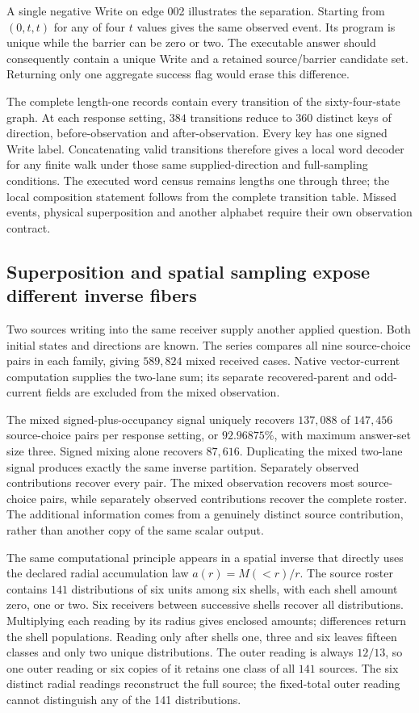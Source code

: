 A single negative Write on edge 002 illustrates the separation. Starting from $(0,t,t)$ for any of four $t$ values gives the same observed event. Its program is unique while the barrier can be zero or two. The executable answer should consequently contain a unique Write and a retained source/barrier candidate set. Returning only one aggregate success flag would erase this difference.

The complete length-one records contain every transition of the sixty-four-state graph. At each response setting, $384$ transitions reduce to $360$ distinct keys of direction, before-observation and after-observation. Every key has one signed Write label. Concatenating valid transitions therefore gives a local word decoder for any finite walk under those same supplied-direction and full-sampling conditions. The executed word census remains lengths one through three; the local composition statement follows from the complete transition table. Missed events, physical superposition and another alphabet require their own observation contract.

\subsection{Superposition and spatial sampling expose different inverse fibers}

Two sources writing into the same receiver supply another applied question. Both initial states and directions are known. The series compares all nine source-choice pairs in each family, giving $589{,}824$ mixed received cases. Native vector-current computation supplies the two-lane sum; its separate recovered-parent and odd-current fields are excluded from the mixed observation. 

The mixed signed-plus-occupancy signal uniquely recovers $137{,}088$ of $147{,}456$ source-choice pairs per response setting, or $92.96875\%$, with maximum answer-set size three. Signed mixing alone recovers $87{,}616$. Duplicating the mixed two-lane signal produces exactly the same inverse partition. Separately observed contributions recover every pair. The mixed observation recovers most source-choice pairs, while separately observed contributions recover the complete roster. The additional information comes from a genuinely distinct source contribution, rather than another copy of the same scalar output.

The same computational principle appears in a spatial inverse that directly uses the declared radial accumulation law $a(r)=M(<r)/r$. The source roster contains $141$ distributions of six units among six shells, with each shell amount zero, one or two. Six receivers between successive shells recover all distributions. Multiplying each reading by its radius gives enclosed amounts; differences return the shell populations. Reading only after shells one, three and six leaves fifteen classes and only two unique distributions. The outer reading is always $12/13$, so one outer reading or six copies of it retains one class of all $141$ sources. The six distinct radial readings reconstruct the full source; the fixed-total outer reading cannot distinguish any of the 141 distributions.

